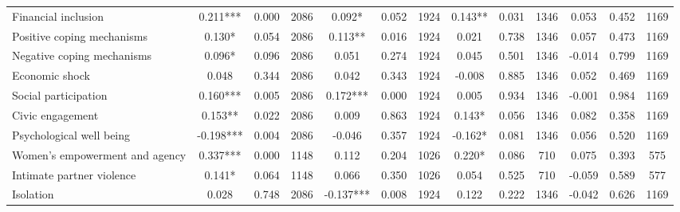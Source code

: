 \begin{tabular}{l*{12}{c}}
 Financial inclusion &        0.211*** &        0.000 & 2086    &        0.092* &        0.052 & 1924    &        0.143** &        0.031 & 1346 &        0.053 &        0.452 & 1169 \\ 

 Positive coping mechanisms &        0.130* &        0.054 & 2086    &        0.113** &        0.016 & 1924    &        0.021 &        0.738 & 1346 &        0.057 &        0.473 & 1169 \\ 

 Negative coping mechanisms &        0.096* &        0.096 & 2086    &        0.051 &        0.274 & 1924    &        0.045 &        0.501 & 1346 &       -0.014 &        0.799 & 1169 \\ 

 Economic shock &        0.048 &        0.344 & 2086    &        0.042 &        0.343 & 1924    &       -0.008 &        0.885 & 1346 &        0.052 &        0.469 & 1169 \\ 

 Social participation &        0.160*** &        0.005 & 2086    &        0.172*** &        0.000 & 1924    &        0.005 &        0.934 & 1346 &       -0.001 &        0.984 & 1169 \\ 

 Civic engagement &        0.153** &        0.022 & 2086    &        0.009 &        0.863 & 1924    &        0.143* &        0.056 & 1346 &        0.082 &        0.358 & 1169 \\ 

 Psychological well being &       -0.198*** &        0.004 & 2086    &       -0.046 &        0.357 & 1924    &       -0.162* &        0.081 & 1346 &        0.056 &        0.520 & 1169 \\ 

 Women's empowerment and agency &        0.337*** &        0.000 & 1148    &        0.112 &        0.204 & 1026    &        0.220* &        0.086 & 710 &        0.075 &        0.393 & 575 \\ 

 Intimate partner violence &        0.141* &        0.064 & 1148    &        0.066 &        0.350 & 1026    &        0.054 &        0.525 & 710 &       -0.059 &        0.589 & 577 \\ 

 Isolation &        0.028 &        0.748 & 2086    &       -0.137*** &        0.008 & 1924    &        0.122 &        0.222 & 1346 &       -0.042 &        0.626 & 1169 \\ 


\end{tabular}
